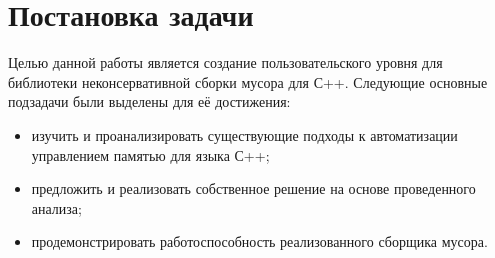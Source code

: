 \section{Постановка задачи}

Целью данной работы является создание пользовательского уровня для библиотеки неконсервативной сборки 
мусора для С++. Следующие основные подзадачи были выделены для её достижения:

\begin{itemize}
\item изучить и проанализировать существующие подходы к автоматизации управлением памятью 
для языка С++;

\item предложить и реализовать собственное решение на основе проведенного анализа;

\item продемонстрировать работоспособность реализованного сборщика мусора.
\end{itemize}
